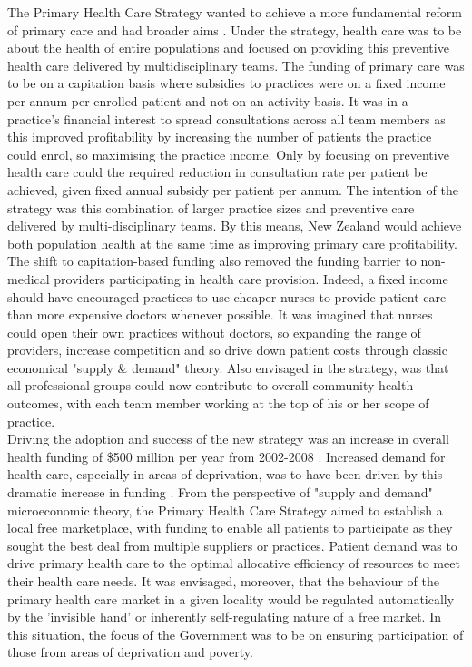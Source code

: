 \documentclass[11pt,a4paper]{article}
\begin{document}
The Primary Health Care Strategy wanted to achieve a more fundamental reform of primary care and had broader aims \citep{king2001primary}. Under the strategy, health care was to be about the health of entire populations and focused on providing this preventive health care delivered by multidisciplinary teams. The funding of primary care was to be on a capitation basis where subsidies to practices were on a fixed income per annum per enrolled patient and not on an activity basis. It was in a practice's financial interest to spread consultations across all team members as this improved profitability by increasing the number of patients the practice could enrol, so maximising the practice income. Only by focusing on preventive health care could the required reduction in consultation rate per patient be achieved, given fixed annual subsidy per patient per annum. The intention of the strategy was this combination of larger practice sizes and preventive care delivered by multi-disciplinary teams. By this means, New Zealand would achieve both population health at the same time as improving primary care profitability\citep{king2001primary}.\\

The shift to capitation-based funding also removed the funding barrier to non-medical providers participating in health care provision. Indeed, a fixed income should have encouraged practices to use cheaper nurses to provide patient care than more expensive doctors whenever possible. It was imagined that nurses could open their own practices without doctors, so expanding the range of providers, increase competition and so drive down patient costs through classic economical "supply \& demand" theory. Also envisaged in the strategy, was that all professional groups could now contribute to overall community health outcomes, with each team member working at the top of his or her scope of practice.\\

Driving the adoption and success of the new strategy was an increase in overall health funding of \$500 million per year from 2002-2008 \citep{gauld2006new}. Increased demand for health care, especially in areas of deprivation, was to have been driven by this dramatic increase in funding \citep{king2001primary}. From the perspective of "supply and demand" microeconomic theory, the Primary Health Care Strategy aimed to establish a local free marketplace, with funding to enable all patients to participate as they sought the best deal from multiple suppliers or practices. Patient demand was to drive primary health care to the optimal allocative efficiency of resources to meet their health care needs. It was envisaged, moreover, that the behaviour of the primary health care market in a given locality would be regulated automatically by the 'invisible hand' or inherently self-regulating nature of a free market. In this situation, the focus of the Government was to be on ensuring participation of those from areas of deprivation and poverty. \\ 
\end{document}
